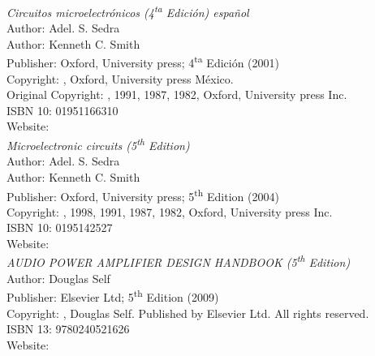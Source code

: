\begin{thebibliography}{9}
\emph{Circuitos microelectrónicos (4\textsuperscript{ta} Edición) español}\\
Author: Adel. S. Sedra\\
Author: Kenneth C. Smith\\
Publisher: Oxford, University press; 4\textsuperscript{ta} Edición (2001)\\
Copyright: \textcopyright {}, Oxford, University press México.\\
Original Copyright: \textcopyright {}, 1991, 1987, 1982, Oxford, University press Inc.\\
ISBN 10: 01951166310\\
Website: \\




\emph{Microelectronic circuits (5\textsuperscript{th} Edition)}\\
Author: Adel. S. Sedra\\
Author: Kenneth C. Smith\\
Publisher: Oxford, University press; 5\textsuperscript{th} Edition (2004)\\
Copyright: \textcopyright {}, 1998, 1991, 1987, 1982, Oxford, University press Inc.\\
ISBN 10: 0195142527\\
Website: \\


\emph{AUDIO POWER AMPLIFIER DESIGN HANDBOOK (5\textsuperscript{th} Edition)}\\
Author: Douglas Self\\
Publisher: Elsevier Ltd; 5\textsuperscript{th} Edition (2009)\\
Copyright: \textcopyright {}, Douglas Self. Published by Elsevier Ltd. All rights reserved.\\
ISBN 13: 9780240521626\\
Website: \\


\end{thebibliography}